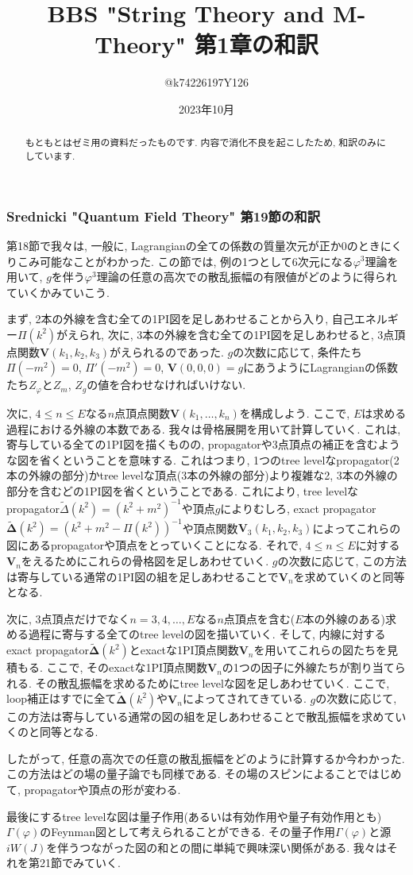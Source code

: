 \documentclass[10pt,a4paper]{jsarticle}
\title{BBS "String Theory and M-Theory" 第1章の和訳}
\author{@k74226197Y126}
\date{2023年10月}
\begin{document}
\maketitle
\begin{abstract}
    もともとはゼミ用の資料だったものです. 内容で消化不良を起こしたため, 和訳のみにしています. 
\end{abstract}
\subsubsection*{Srednicki "Quantum Field Theory" 第19節の和訳}
第18節で我々は, 一般に, Lagrangianの全ての係数の質量次元が正か0のときにくりこみ可能なことがわかった. この節では, 例の1つとして6次元になる$\varphi^3$理論を用いて, $g$を伴う$\varphi^3$理論の任意の高次での散乱振幅の有限値がどのように得られていくかみていこう. \par
まず, 2本の外線を含む全ての1PI図を足しあわせることから入り, 自己エネルギー$\Pi (k^2)$がえられ, 次に, 3本の外線を含む全ての1PI図を足しあわせると, 3点頂点関数$\mathbf{V} (k_1,k_2,k_3)$がえられるのであった. $g$の次数に応じて, 条件たち$\Pi ( -m^2 ) = 0$, $\Pi' ( -m^2 ) = 0$, $\mathbf{V} (0,0,0) = g$にあうようにLagrangianの係数たち$Z_\varphi $と$Z_m$, $Z_g$の値を合わせなければいけない. \par
次に, $4\leq n\leq E$なる$n$点頂点関数$\mathbf{V} (k_1,\ldots ,k_n) $を構成しよう. ここで, $E$は求める過程における外線の本数である. 我々は骨格展開を用いて計算していく. これは, 寄与している全ての1PI図を描くものの, propagatorや3点頂点の補正を含むような図を省くということを意味する. これはつまり, 1つのtree levelなpropagator(2本の外線の部分)かtree levelな頂点(3本の外線の部分)より複雑な2, 3本の外線の部分を含むどの1PI図を省くということである. これにより, tree levelなpropagator$\widetilde{\Delta} ( k^2 )  = ( k^2 + m^2 )^{-1} $や頂点$g$によりむしろ, exact propagator$\widetilde{\boldsymbol{\Delta}} ( k^2 ) = ( k^2 + m^2 - \Pi (k^2) )^{-1} $や頂点関数$\mathbf{V}_3 (k_1,k_2,k_3) $によってこれらの図にあるpropagatorや頂点をとっていくことになる. それで, $4\leq n \leq E$に対する$\mathbf{V}_n $をえるためにこれらの骨格図を足しあわせていく. $g$の次数に応じて, この方法は寄与している通常の1PI図の組を足しあわせることで$\mathbf{V}_n $を求めていくのと同等となる. \par
次に, 3点頂点だけでなく$n = 3,4,\ldots , E$なる$n$点頂点を含む($E$本の外線のある)求める過程に寄与する全てのtree levelの図を描いていく. そして, 内線に対するexact propagator$\widetilde{\boldsymbol{\Delta}} ( k^2 )$とexactな1PI頂点関数$\mathbf{V}_n $を用いてこれらの図たちを見積もる. ここで, そのexactな1PI頂点関数$\mathbf{V}_n $の1つの因子に外線たちが割り当てられる. その散乱振幅を求めるためにtree levelな図を足しあわせていく. ここで, loop補正はすでに全て$\widetilde{\boldsymbol{\Delta}} ( k^2 ) $や$\mathbf{V}_n$によってされてきている. $g$の次数に応じて, この方法は寄与している通常の図の組を足しあわせることで散乱振幅を求めていくのと同等となる. \par
したがって, 任意の高次での任意の散乱振幅をどのように計算するか今わかった. この方法はどの場の量子論でも同様である. その場のスピンによることではじめて, propagatorや頂点の形が変わる. \par
最後にするtree levelな図は量子作用(あるいは有効作用や量子有効作用とも)$\Gamma ( \varphi ) $のFeynman図として考えられることができる. その量子作用$\Gamma ( \varphi ) $と源$iW ( J ) $を伴うつながった図の和との間に単純で興味深い関係がある. 我々はそれを第21節でみていく. 
\end{document}
